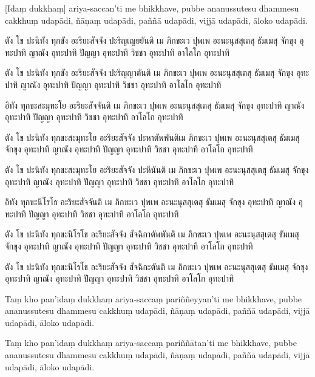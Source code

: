 \documentclass[
  babelLanguage=thai,
  final,
]{chantingbook}
\begin{document}
\enlargethispage{\baselineskip}

[Idaṃ dukkhaṃ] ariya-saccan'ti me bhikkhave, pubbe ananussutesu dhammesu
cakkhuṃ udapādi, ñāṇaṃ udapādi, paññā udapādi, vijjā udapādi, āloko
udapādi.

\clearpage

\thaiText
\markboth{\thaiTitle}{\rightmark}

ตัง โข ปะนิทัง ทุกขัง อะริยะสัจจัง ปะริญเญยยันติ เม ภิกขะเว ปุพเพ อะนะนุสสุเตสุ
ธัมเมสุ จักขุง อุทะปาทิ ญาณัง อุทะปาทิ ปัญญา อุทะปาทิ วิชชา อุทะปาทิ อาโลโก อุทะปาทิ

ตัง โข ปะนิทัง ทุกขัง อะริยะสัจจัง ปะริญญาตันติ เม ภิกขะเว ปุพเพ อะนะนุสสุเตสุ ธัมเมสุ จักขุง
อุทะปาทิ ญาณัง อุทะปาทิ ปัญญา อุทะปาทิ วิชชา อุทะปาทิ อาโลโก อุทะปาทิ

อิทัง ทุกขะสะมุทะโย อะริยะสัจจันติ เม ภิกขะเว ปุพเพ อะนะนุสสุเตสุ ธัมเมสุ
จักขุง อุทะปาทิ ญาณัง อุทะปาทิ ปัญญา อุทะปาทิ วิชชา อุทะปาทิ อาโลโก อุทะปาทิ

ตัง โข ปะนิทัง ทุกขะสะมุทะโย อะริยะสัจจัง ปะหาตัพพันติเม ภิกขะเว ปุพเพ อะนะนุสสุเตสุ
ธัมเมสุ จักขุง อุทะปาทิ ญาณัง อุทะปาทิ ปัญญา อุทะปาทิ วิชชา อุทะปาทิ อาโลโก อุทะปาทิ 

ตัง โข ปะนิทัง ทุกขะสะมุทะโย อะริยะสัจจัง ปะหีนันติ เม ภิกขะเว ปุพเพ อะนะนุสสุเตสุ ธัมเมสุ
จักขุง อุทะปาทิ ญาณัง อุทะปาทิ ปัญญา อุทะปาทิ วิชชา อุทะปาทิ อาโลโก อุทะปาทิ

อิทัง ทุกขะนิโรโธ อะริยะสัจจันติ เม ภิกขะเว ปุพเพ อะนะนุสสุเตสุ ธัมเมสุ จักขุง
อุทะปาทิ ญาณัง อุทะปาทิ ปัญญา อุทะปาทิ วิชชา อุทะปาทิ อาโลโก อุทะปาทิ 

ตัง โข ปะนิทัง ทุกขะนิโรโธ อะริยะสัจจัง สัจฉิกาตัพพันติ เม ภิกขะเว ปุพเพ อะนะนุสสุเตสุ
ธัมเมสุ จักขุง อุทะปาทิ ญาณัง อุทะปาทิ ปัญญา อุทะปาทิ วิชชา อุทะปาทิ อาโลโก อุทะปาทิ 

ตัง โข ปะนิทัง ทุกขะนิโรโธ อะริยะสัจจัง สัจฉิกะตันติ เม ภิกขะเว ปุพเพ อะนะนุสสุเตสุ ธัมเมสุ
จักขุง อุทะปาทิ ญาณัง อุทะปาทิ ปัญญา อุทะปาทิ วิชชา อุทะปาทิ อาโลโก อุทะปาทิ 

\clearpage

\paliText
\markboth{\paliTitle}{\rightmark}

Taṃ kho pan'idaṃ dukkhaṃ ariya-saccaṃ pariññeyyan'ti me bhikkhave, pubbe
ananussutesu dhammesu cakkhuṃ udapādi, ñāṇaṃ udapādi, paññā udapādi,
vijjā udapādi, āloko udapādi.

Taṃ kho pan'idaṃ dukkhaṃ ariya-saccaṃ pariññātan'ti me bhikkhave, pubbe
ananussutesu dhammesu cakkhuṃ udapādi, ñāṇaṃ udapādi, paññā udapādi,
vijjā udapādi, āloko udapādi.
\end{document}
